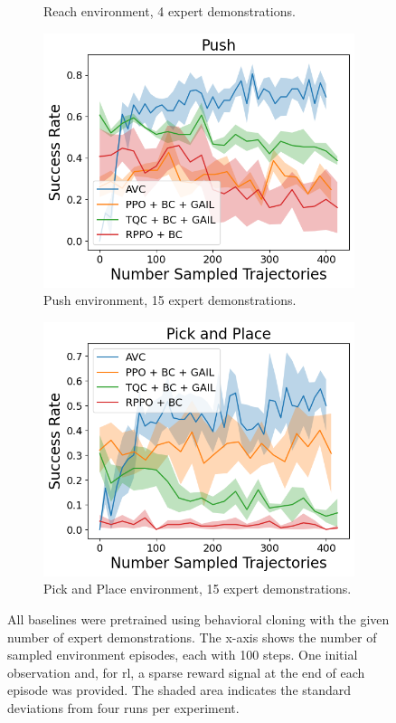 \begin{figure}[htbp]
\begin{subfigure}[t]{0.45\textwidth}
    \caption{Reach environment, 4 expert demonstrations.}
  \end{subfigure}
  \medskip
  \begin{subfigure}[t]{0.45\textwidth}
    \includegraphics[width=\textwidth]{images/15_400/Push.png}
    \caption{Push environment, 15 expert demonstrations.}
  \end{subfigure}
  \begin{subfigure}[t]{0.45\textwidth}
    \includegraphics[width=\textwidth]{images/15_400/Pick and Place.png}
    \caption{Pick and Place environment, 15 expert demonstrations.}
  \end{subfigure}
  \caption{
    All baselines were pretrained using behavioral cloning with the given number of expert demonstrations. 
    The x-axis shows the number of sampled environment episodes, each with 100 steps. 
    One initial observation and, for \ac{rl}, a sparse reward signal at the end of each episode was provided. 
    The shaded area indicates the standard deviations from four runs per experiment.}
    \label{fig:finetuning}
\end{figure}

